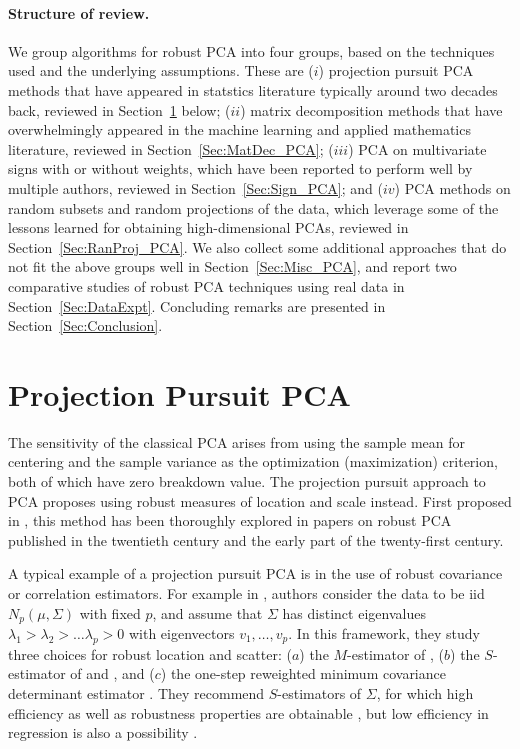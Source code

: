 \documentclass[ss]{imsart}
\theoremstyle{Example}
\newcommand{\attention}[1]{{\color{red}{\textbf{[ATTENTION:#1]}}}}
\begin{document}
\paragraph{Structure of review.}
We group algorithms for robust PCA into four groups, based on the techniques used and the underlying assumptions. These are ($i$) projection pursuit PCA methods that have appeared in statstics literature typically around two decades back, reviewed in Section~\ref{Sec:PP_PCA} below; ($ii$) matrix decomposition methods that have overwhelmingly appeared in the machine learning and applied mathematics literature, reviewed in Section~\ref{Sec:MatDec_PCA}; ($iii$) PCA on multivariate signs with or without weights, which have been reported to perform well by multiple authors, reviewed in Section~\ref{Sec:Sign_PCA}; and ($iv$) PCA methods on random subsets and random projections of the data, which leverage some of the lessons learned for obtaining high-dimensional PCAs, reviewed in Section~\ref{Sec:RanProj_PCA}. We also collect some additional approaches that do not fit the above groups well in Section~\ref{Sec:Misc_PCA}, and report two comparative studies of robust PCA techniques using real data in Section~\ref{Sec:DataExpt}. Concluding remarks are presented in Section~\ref{Sec:Conclusion}. 




\section{Projection Pursuit PCA}
\label{Sec:PP_PCA}


The sensitivity of the classical PCA arises from using the sample mean for centering and the sample variance as the optimization (maximization) criterion, both of which have zero breakdown value. The projection pursuit approach to PCA proposes using  robust measures of location and scale instead. First proposed in \cite{ref:JASA85759_RPCA}, this method has been thoroughly explored in papers on robust PCA published in the twentieth century and the early part of the twenty-first century. 

A typical example of a projection pursuit PCA is in the use of robust covariance or correlation estimators. For example in   \cite{ref:Biometrika00603_CrouxHaesbroeck_RPCA}, 
authors consider  the data to be iid $N_{p} (\mu, \Sigma)$ with fixed $p$, and 
assume that $\Sigma$ has distinct eigenvalues 
 $\lambda_{1} > \lambda_{2} > \ldots \lambda_{p} > 0$ with eigenvectors 
 $v_{1}, \ldots, v_{p}$. In this framework, they
study three choices for robust location and scatter: 
($a$) the $M$-estimator of \cite{ref:AoS7651_Maronna_Robust}, 
($b$) the $S$-estimator of \cite{rousseeuw2005robust}
and \cite{ref:AoS871269_Robust}, and ($c$) the one-step reweighted minimum covariance determinant estimator \cite{rousseeuw1985multivariate}. 
They recommend $S$-estimators of $\Sigma$, for which high efficiency as well as robustness properties are obtainable \cite{ref:Test14356_SEstimator, ref:SJS11332_Croux_SEstimator}, but low efficiency in regression is also a possibility \cite{ref:SPL92413_SEstimator}. 
\end{document}
